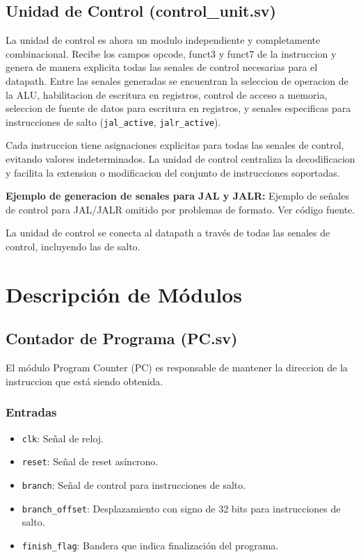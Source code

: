 \documentclass[conference]{IEEEtran}
\begin{document}
\subsection{Unidad de Control (control\_unit.sv)}
La unidad de control es ahora un modulo independiente y completamente combinacional. Recibe los campos opcode, funct3 y funct7 de la instruccion y genera de manera explicita todas las senales de control necesarias para el datapath. Entre las senales generadas se encuentran la seleccion de operacion de la ALU, habilitacion de escritura en registros, control de acceso a memoria, seleccion de fuente de datos para escritura en registros, y senales especificas para instrucciones de salto (\texttt{jal\_active}, \texttt{jalr\_active}).

Cada instruccion tiene asignaciones explicitas para todas las senales de control, evitando valores indeterminados. La unidad de control centraliza la decodificacion y facilita la extension o modificacion del conjunto de instrucciones soportadas.

\textbf{Ejemplo de generacion de senales para JAL y JALR:}
Ejemplo de señales de control para JAL/JALR omitido por problemas de formato. Ver código fuente.

La unidad de control se conecta al datapath a través de todas las senales de control, incluyendo las de salto.

\section{Descripción de Módulos}
\label{sec:module_descriptions}

\subsection{Contador de Programa (PC.sv)}
El módulo Program Counter (PC) es responsable de mantener la direccion de la instruccion que está siendo obtenida.
\subsubsection{Entradas}
\begin{itemize}
    \item \texttt{clk}: Señal de reloj.
    \item \texttt{reset}: Señal de reset asíncrono.
    \item \texttt{branch}: Señal de control para instrucciones de salto.
    \item \texttt{branch\_offset}: Desplazamiento con signo de 32 bits para instrucciones de salto.
    \item \texttt{finish\_flag}: Bandera que indica finalización del programa.
\end{itemize}
\end{document}

